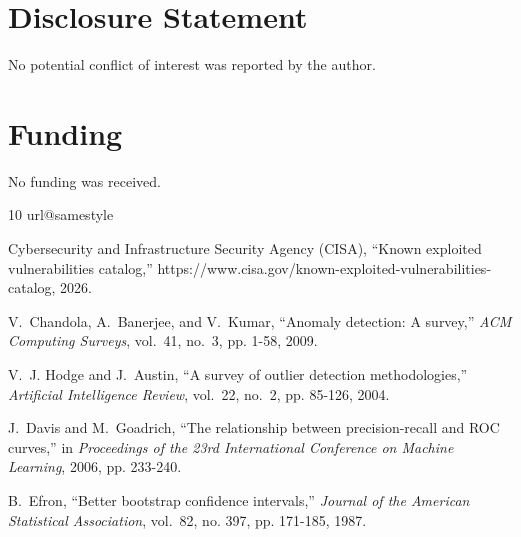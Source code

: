 \documentclass[journal]{IEEEtran}
\begin{document}
\section*{Disclosure Statement}
No potential conflict of interest was reported by the author.

\section*{Funding}
No funding was received.

\begin{thebibliography}{10}
\providecommand{\url}[1]{#1}
\csname url@samestyle\endcsname
\providecommand{\newblock}{\relax}
\providecommand{\bibinfo}[2]{#2}
\providecommand{\BIBentrySTDinterwordspacing}{\spaceskip=0pt\relax}
\providecommand{\BIBentryALTinterwordstretchfactor}{4}
\providecommand{\BIBentryALTinterwordspacing}{\spaceskip=\fontdimen2\font plus
\BIBentryALTinterwordstretchfactor\fontdimen3\font minus
  \fontdimen4\font\relax}
\providecommand{\BIBforeignlanguage}[2]{{%
\expandafter\ifx\csname l@#1\endcsname\relax
\typeout{** WARNING: IEEEtran.bst: No hyphenation pattern has been}%
\typeout{** loaded for the language `#1'. Using the pattern for}%
\typeout{** the default language instead.}%
\else
\language=\csname l@#1\endcsname
\fi
#2}}
\providecommand{\BIBdecl}{\relax}
\BIBdecl

{Cybersecurity and Infrastructure Security Agency (CISA)}, ``Known exploited
  vulnerabilities catalog,''
  \url{https://www.cisa.gov/known-exploited-vulnerabilities-catalog}, 2026.

V.~Chandola, A.~Banerjee, and V.~Kumar, ``Anomaly detection: A survey,''
  \emph{ACM Computing Surveys}, vol.~41, no.~3, pp. 1-58, 2009.

V.~J. Hodge and J.~Austin, ``A survey of outlier detection methodologies,''
  \emph{Artificial Intelligence Review}, vol.~22, no.~2, pp. 85-126, 2004.

J.~Davis and M.~Goadrich, ``The relationship between precision-recall and {ROC}
  curves,'' in \emph{Proceedings of the 23rd International Conference on
  Machine Learning}, 2006, pp. 233-240.

B.~Efron, ``Better bootstrap confidence intervals,'' \emph{Journal of the
  American Statistical Association}, vol.~82, no. 397, pp. 171-185, 1987.


\end{thebibliography}
\end{document}
